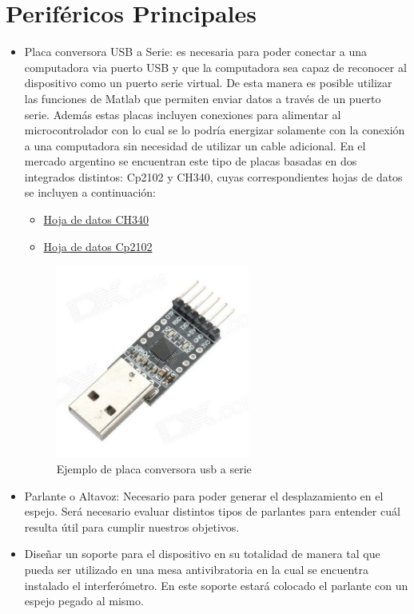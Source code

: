 \section{Periféricos Principales}
\label{sec:perif}

\begin{itemize}
\item Placa conversora USB a Serie: es necesaria para poder conectar a una computadora via puerto USB y que la computadora sea capaz de reconocer al dispositivo como un puerto serie virtual. De esta manera es posible utilizar las funciones de Matlab que permiten enviar datos a través de un puerto serie. Además estas placas incluyen conexiones para alimentar al microcontrolador con lo cual se lo podría energizar solamente con la conexión a una computadora sin necesidad de utilizar un cable adicional. En el mercado argentino se encuentran este tipo de placas basadas en dos integrados distintos: Cp2102 y CH340, cuyas correspondientes hojas de datos se incluyen a continuación:
\begin{itemize}
\item \href{https://www.olimex.com/Products/Breadboarding/BB-CH340T/resources/CH340DS1.PDF}{\color{blue} Hoja de datos CH340}
\item \href{https://www.sparkfun.com/datasheets/IC/cp2102.pdf}{\color{blue} Hoja de datos Cp2102}
\end{itemize}

\begin{figure}[H]
  \centering
  \includegraphics[width=0.6\textwidth]{images/conversor_usbttl.png}
  \caption{Ejemplo de placa conversora usb a serie}
  \label{fig:usbattl}
\end{figure}

\item Parlante o Altavoz: Necesario para poder generar el desplazamiento en el espejo. Será necesario evaluar distintos tipos de parlantes para entender cuál resulta útil para cumplir nuestros objetivos.
\item Diseñar un soporte para el dispositivo en su totalidad de manera tal que pueda ser utilizado en una mesa antivibratoria en la cual se encuentra instalado el interferómetro. En este soporte estará colocado el parlante con un espejo pegado al mismo.
\end{itemize}